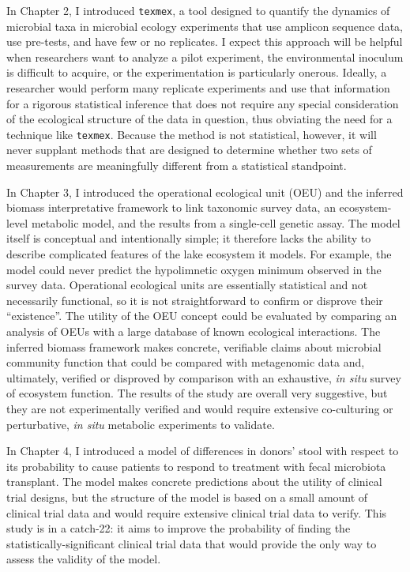 In Chapter 2, I introduced \texttt{texmex}, a tool designed to quantify the dynamics of
microbial taxa in microbial ecology experiments that use amplicon sequence
data, use pre-tests, and have few or no replicates. I expect this approach
will be helpful when researchers want to analyze a pilot experiment, the
environmental inoculum is difficult to acquire, or the experimentation is
particularly onerous. Ideally, a researcher would perform many replicate
experiments and use that information for a rigorous statistical inference that
does not require any special consideration of the ecological structure of the
data in question, thus obviating the need for a technique like \texttt{texmex}.
Because the method is not statistical, however, it will never supplant
methods that are designed to determine whether two sets of measurements are
meaningfully different from a statistical standpoint.

In Chapter 3, I introduced the operational ecological unit (OEU) and
the inferred biomass interpretative framework to link taxonomic survey data, an
ecosystem-level metabolic model, and the results from a single-cell genetic
assay. The model itself is conceptual and intentionally simple; it therefore
lacks the ability to describe complicated features of the lake
ecosystem it models. For example, the model could never predict the
hypolimnetic oxygen minimum observed in the survey data. Operational
ecological units are essentially statistical and not necessarily functional,
so it is not straightforward to confirm or disprove their ``existence''. The
utility of the OEU concept could be evaluated by comparing an analysis of OEUs
with a large database of known ecological interactions. The inferred biomass
framework makes concrete, verifiable claims about microbial community function
that could be compared with metagenomic data and, ultimately, verified or
disproved by comparison with an exhaustive, \textit{in situ} survey of
ecosystem function. The results of the study are overall very suggestive, but
they are not experimentally verified and would require extensive co-culturing
or perturbative, \textit{in situ} metabolic experiments to validate.

In Chapter 4, I introduced a model of differences in donors' stool with
respect to its probability to cause patients to respond to treatment with fecal microbiota
transplant. The model makes concrete predictions about the utility of clinical
trial designs, but the structure of the model is based on a small amount of
clinical trial data and would require extensive clinical trial data to verify.
This study is in a catch-22: it aims to improve the probability of finding the
statistically-significant clinical trial data that would provide the only way to
assess the validity of the model.

